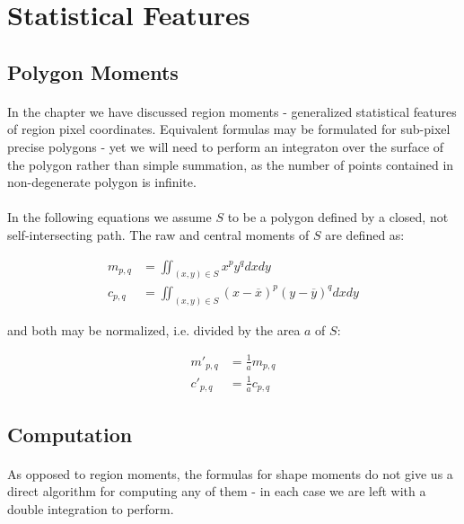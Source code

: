 
\section{Statistical Features}

\subsection{Polygon Moments}

\paragraph*{}
In the  chapter we have discussed region moments - generalized statistical features of region pixel coordinates. Equivalent formulas may be formulated for sub-pixel precise polygons - yet we will need to perform an integraton over the surface of the polygon rather than simple summation, as the number of points contained in non-degenerate polygon is infinite.

\paragraph*{}
In the following equations we assume $S$ to be a polygon defined by a closed, not self-intersecting path. The raw and central moments of $S$ are defined as:

\begin{align*}
	m_{p,q} &= \iint_{(x,y) \in S} x^p y^q dx dy \\
	c_{p,q} &= \iint_{(x,y) \in S} (x-\overline{x})^p (y-\overline{y})^q dx dy
\end{align*}

and both may be normalized, i.e. divided by the area $a$ of $S$:

\begin{align*}
	m'_{p,q} &= \frac{1}{a} m_{p,q}\\
	c'_{p,q} &= \frac{1}{a} c_{p,q}
\end{align*}

\subsection{Computation}

\paragraph*{}
As opposed to region moments, the formulas for shape moments do not give us a direct algorithm for computing any of them - in each case we are left with a double integration to perform.

